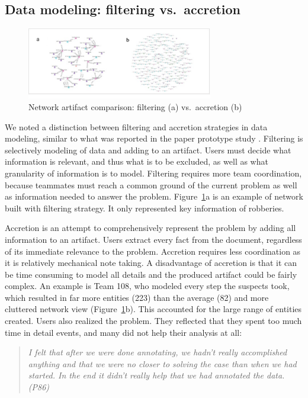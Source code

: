 \subsection{Data modeling: filtering vs.~accretion}\label{data-modeling-accretion-vs.filtering}

\begin{figure}
\centering
\includegraphics[width=3.20000in]{./img/network_accretion_filter.png}
\caption{Network artifact comparison: filtering (a)
vs.~accretion (b) \label{fig:network_accretion}}
\end{figure}

We noted a distinction between filtering and accretion
strategies in data modeling, similar to what was reported in the paper prototype study \cite{Carroll2013}. Filtering is selectively modeling of data
and adding to an artifact. Users must decide what information is
relevant, and thus what is to be excluded, as well as what granularity
of information is to model. Filtering requires more team coordination,
because teammates must reach a common ground of the current problem as
well as information needed to answer the problem. Figure~\ref{fig:network_accretion}a is an example of network built with filtering strategy. It only represented key information of robberies.

Accretion is an attempt to comprehensively represent the problem by
adding all information to an artifact. Users extract every fact from the
document, regardless of its immediate relevance to the problem.
Accretion requires less coordination as it is relatively mechanical note
taking. A disadvantage of accretion is that it can be time consuming
to model all details and the produced artifact could be fairly complex.
An example is Team 108, who modeled
every step the suspects took, which resulted in far more entities (223) than
the average (82) and more cluttered network view (Figure~\ref{fig:network_accretion}b). This accounted for the large range of entities created. Users also realized the problem. They reflected that they spent too
much time in detail events, and many did not help their analysis at all: 

\begin{quote}
\emph{I felt that after we were done annotating, we hadn't really accomplished
anything and that we were no closer to solving the case than when we had
started. In the end it didn't really help that we had annotated the
data. (P86)}
\end{quote}

